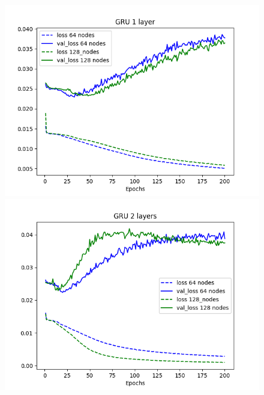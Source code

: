 \documentclass[11pt]
{article}
\begin{document}
\begin{figure}[H]
\begin{minipage}[b]{0.33\linewidth}
		\includegraphics[width=\linewidth]{../TESTS_RESULTS/GRU_tests/plots/1_comp.png} 
	\end{minipage}%
	\begin{minipage}[b]{0.33\linewidth}
		\centering
		\includegraphics[width=\linewidth]{../TESTS_RESULTS/GRU_tests/plots/2_comp.png} 
	\end{minipage} 
	\begin{minipage}[b]{0.33\linewidth}
		\centering

\end{minipage}
\end{figure}
\end{document}
